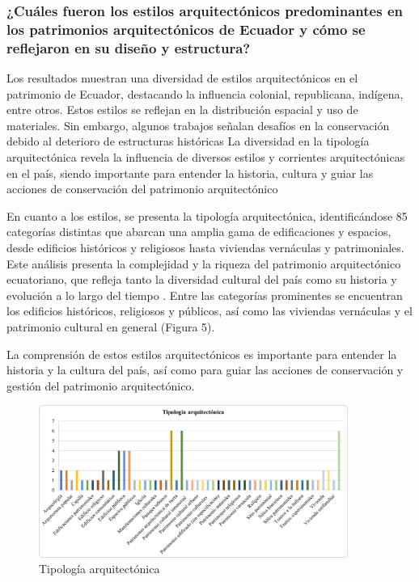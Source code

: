 \documentclass[journal,article,submit,pdftex,moreauthors]{Definitions/mdpi}
\begin{document}
\subsubsection{\textbf{¿Cuáles fueron los estilos arquitectónicos predominantes en los patrimonios arquitectónicos de Ecuador y cómo se reflejaron en su diseño y estructura?}}
\par %
Los resultados muestran una diversidad de estilos arquitectónicos en el patrimonio de Ecuador, destacando la influencia colonial, republicana, indígena, entre otros. Estos estilos se reflejan en la distribución espacial y uso de materiales. Sin embargo, algunos trabajos señalan desafíos en la conservación debido al deterioro de estructuras históricas \cite{art:articulo18} La diversidad en la tipología arquitectónica revela la influencia de diversos estilos y corrientes arquitectónicas en el país, siendo importante para entender la historia, cultura y guiar las acciones de conservación del patrimonio arquitectónico \cite{art:articulo17}
\par %
En cuanto a los estilos, se presenta la tipología arquitectónica, identificándose 85 categorías distintas que abarcan una amplia gama de edificaciones y espacios, desde edificios históricos y religiosos hasta viviendas vernáculas y patrimoniales. Este análisis presenta la complejidad y la riqueza del patrimonio arquitectónico ecuatoriano, que refleja tanto la diversidad cultural del país como su historia y evolución a lo largo del tiempo \cite{art:articulo19}. Entre las categorías prominentes se encuentran los edificios históricos, religiosos y públicos, así como las viviendas vernáculas y el patrimonio cultural en general (Figura 5)\cite{art:articulo20}.
\par %
La comprensión de estos estilos arquitectónicos es importante para entender la historia y la cultura del país, así como para guiar las acciones de conservación y gestión del patrimonio arquitectónico.
 \par %
  \begin{figure} [h!]
    \centering
    \includegraphics[width=0.9\textwidth]{Graficos/Tipología arquitectónica.png }
    \caption{Tipología arquitectónica}
    \label{fig:grafico}
\end{figure}
\end{document}
